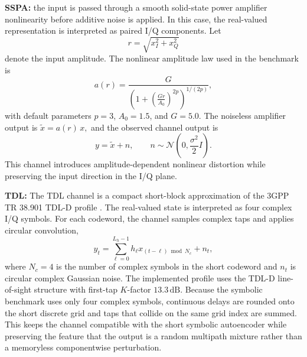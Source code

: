\textbf{SSPA:}
the input is passed through a smooth solid-state power amplifier nonlinearity before additive noise is applied.
In this case, the real-valued representation is interpreted as paired I/Q components.
Let
\begin{equation}
r = \sqrt{x_I^2 + x_Q^2}
\end{equation}
denote the input amplitude.
The nonlinear amplitude law used in the benchmark is
\begin{equation}
a(r)
=
\frac{G}{\left(1+\left(\frac{Gr}{A_0}\right)^{2p}\right)^{1/(2p)}},
\end{equation}
with default parameters \(p=3\), \(A_0=1.5\), and \(G=5.0\).
The noiseless amplifier output is $\tilde{x} = a(r)\,x,$
and the observed channel output is
\begin{equation}
y = \tilde{x} + n,
\qquad
n \sim \mathcal{N}\!\left(0,\frac{\sigma^2}{2}I\right).
\end{equation}
This channel introduces amplitude-dependent nonlinear distortion while preserving the input direction in the I/Q plane.

\textbf{TDL:}
The TDL channel is a compact short-block approximation of the 3GPP TR 38.901 TDL-D profile \cite{tr38901}.
The real-valued state is interpreted as four complex I/Q symbols.
For each codeword, the channel samples complex taps and applies circular convolution,
\begin{equation}
y_t
=
\sum_{\ell=0}^{L_h-1} h_\ell x_{(t-\ell)\bmod N_c} + n_t,
\end{equation}
where \(N_c=4\) is the number of complex symbols in the short codeword and \(n_t\) is circular complex Gaussian noise.
The implemented profile uses the TDL-D line-of-sight structure with first-tap \(K\)-factor \(13.3\,\mathrm{dB}\).
Because the symbolic benchmark uses only four complex symbols, continuous delays are rounded onto the short discrete grid and taps that collide on the same grid index are summed.
This keeps the channel compatible with the short symbolic autoencoder while preserving the feature that the output is a random multipath mixture rather than a memoryless componentwise perturbation.
